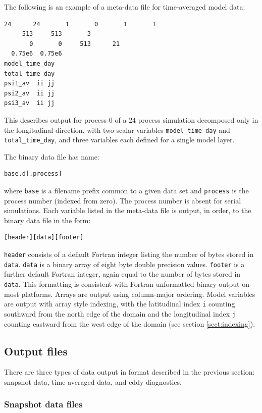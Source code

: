 \documentclass[a4paper]{book}
\begin{document}
The following is an example of a meta-data file for time-averaged model data:
\begin{lstlisting}[language = bash, frame = single]
      24      24       1       0       1       1
     513     513       3
       0       0     513      21
  0.75e6  0.75e6
model_time_day
total_time_day
psi1_av  ii jj
psi2_av  ii jj
psi3_av  ii jj
\end{lstlisting}
This describes output for process $0$ of a $24$ process simulation decomposed
only in the longitudinal direction, with two scalar variables
\verb+model_time_day+ and \verb+total_time_day+, and three variables each
defined for a single model layer.

The binary data file has name:
\begin{lstlisting}[language = bash, frame = single]
base.d[.process]
\end{lstlisting}
where \verb+base+ is a filename prefix common to a given data set and
\verb+process+ is the process number (indexed from zero). The process number is
absent for serial simulations. Each variable listed in the meta-data file is
output, in order, to the binary data file in the form:
\begin{lstlisting}[language = bash, frame = single]
[header][data][footer]
\end{lstlisting}
\verb+header+ consists of a default Fortran integer listing the number of bytes
stored in \verb+data+. \verb+data+ is a binary array of eight byte double
precision values. \verb+footer+ is a further default Fortran integer, again
equal to the number of bytes stored in \verb+data+. This formatting is
consistent with Fortran unformatted binary output on most platforms. Arrays are
output using column-major ordering. Model variables are output with array style
indexing, with the latitudinal index \verb+i+ counting southward from the north
edge of the domain and the longitudinal index \verb+j+ counting eastward from
the west edge of the domain (see section \ref{sect:indexing}).

\subsection{Output files}\label{sect:output_files}

There are three types of data output in format described in the previous
section: snapshot data, time-averaged data, and eddy diagnostics.

\subsubsection{Snapshot data files}\label{sect:snapshot_data_files}
\end{document}
